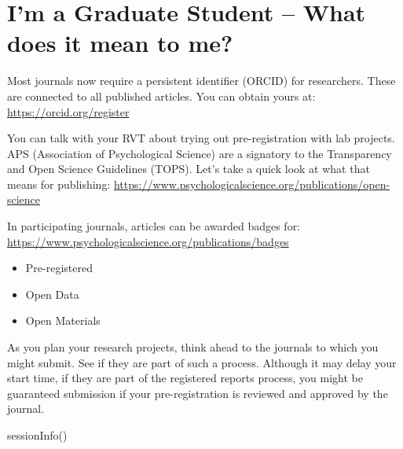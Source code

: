 \documentclass[
  english,
]{book}
\newenvironment{Shaded}{\begin{snugshade}}{\end{snugshade}}
\newcommand{\FunctionTok}[1]{\textcolor[rgb]{0.00,0.00,0.00}{#1}}
\newcommand{\NormalTok}[1]{#1}
\providecommand{\tightlist}{%
  \setlength{\itemsep}{0pt}\setlength{\parskip}{0pt}}
\begin{document}
\hypertarget{im-a-graduate-student-what-does-it-mean-to-me}{%
\section{I'm a Graduate Student -- What does it mean to me?}\label{im-a-graduate-student-what-does-it-mean-to-me}}

Most journals now require a persistent identifier (ORCID) for researchers. These are connected to all published articles. You can obtain yours at: \url{https://orcid.org/register}

You can talk with your RVT about trying out pre-registration with lab projects.
APS (Association of Psychological Science) are a signatory to the Transparency and Open Science Guidelines (TOPS). Let's take a quick look at what that means for publishing:
\url{https://www.psychologicalscience.org/publications/open-science}

In participating journals, articles can be awarded badges for:
\url{https://www.psychologicalscience.org/publications/badges}

\begin{itemize}
\tightlist
\item
  Pre-registered
\item
  Open Data
\item
  Open Materials
\end{itemize}

As you plan your research projects, think ahead to the journals to which you might submit. See if they are part of such a process. Although it may delay your start time, if they are part of the registered reports process, you might be guaranteed submission if your pre-registration is reviewed and approved by the journal.

\begin{Shaded}
\begin{Highlighting}[]
\FunctionTok{sessionInfo}\NormalTok{()}
\end{Highlighting}
\end{Shaded}
\end{document}
